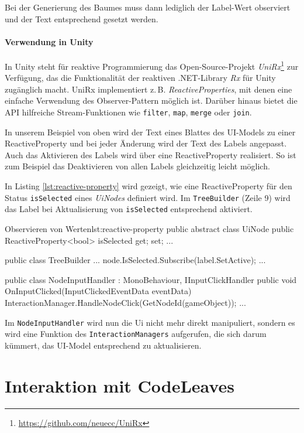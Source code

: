 Bei der Generierung des Baumes muss dann lediglich der Label-Wert observiert und der Text entsprechend gesetzt werden.

\subsubsection*{Verwendung in Unity}

In Unity steht für reaktive Programmierung das Open-Source-Projekt \textit{UniRx}\footnote{\url{https://github.com/neuecc/UniRx}} zur Verfügung, das die Funktionalität der reaktiven .NET-Library \textit{Rx} für Unity zugänglich macht. UniRx implementiert z.\,B. \textit{ReactiveProperties}, mit denen eine einfache Verwendung des Observer-Pattern möglich ist. Darüber hinaus bietet die API hilfreiche Stream-Funktionen wie \texttt{filter}, \texttt{map}, \texttt{merge} oder \texttt{join}.

In unserem Beispiel von oben wird der Text eines Blattes des UI-Models zu einer ReactiveProperty und bei jeder Änderung wird der Text des Labels angepasst. Auch das Aktivieren des Labels wird über eine ReactiveProperty realisiert. So ist zum Beispiel das Deaktivieren von allen Labels gleichzeitig leicht möglich.

In Listing \ref{lst:reactive-property} wird gezeigt, wie eine ReactiveProperty für den Status \texttt{isSelected} eines \textit{UiNodes} definiert wird. Im \texttt{TreeBuilder} (Zeile 9) wird das Label bei Aktualisierung von \texttt{isSelected} entsprechend aktiviert.

\begin{codesnippet}{Observieren von Werten}{lst:reactive-property}
public abstract class UiNode
{
    public ReactiveProperty<bool> isSelected { get; set; }
    ...
}

public class TreeBuilder {
    ...
    node.IsSelected.Subscribe(label.SetActive);
    ...
}

public class NodeInputHandler : MonoBehaviour, IInputClickHandler
{
    public void OnInputClicked(InputClickedEventData eventData)
    {
        InteractionManager.HandleNodeClick(GetNodeId(gameObject));
    }
    ...
}
\end{codesnippet}

Im \texttt{NodeInputHandler} wird nun die Ui nicht mehr direkt manipuliert, sondern es wird eine Funktion des \texttt{InteractionManagers} aufgerufen, die sich darum kümmert, das UI-Model entsprechend zu aktualisieren.

\chapter{Interaktion mit CodeLeaves}
\label{ch:interaction}

